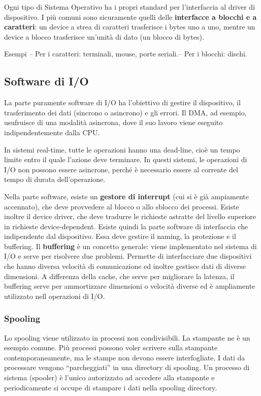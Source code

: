 \documentclass[a4paper]{article}
\begin{document}
Ogni tipo di Sistema Operativo ha i propri standard per l'interfaccia al driver di dispositivo. I più comuni sono sicuramente quelli delle \textbf{interfacce a blocchi e a caratteri}: un device a strea di caratteri trasferisce i bytes uno a uno, mentre un device a blocco trasferisce un'unità di dato (un blocco di bytes).

Esempi \newline -- Per i caratteri: terminali, mouse, porte seriali.\newline -- Per i blocchi: dischi.

\subsection{Software di I/O}
La parte puramente software di I/O ha l'obiettivo di gestire il dispositivo, il trasferimento dei dati (sincrono o asincrono) e gli errori. Il DMA, ad esempio, usufruisce di una modalità asincrona, dove il suo lavoro viene eseguito indipendentemente dalla CPU.

In sistemi real-time, tutte le operazioni hanno una dead-line, cioè un tempo limite entro il quale l'azione deve terminare. In questi sistemi, le operazioni di I/O non possono essere asincrone, perché è necessario essere al corrente del tempo di durata dell'operazione.

Nella parte software, esiste un \textbf{gestore di interrupt} (cui si è già ampiamente accennato), che deve provvedere al blocco o allo sblocco dei processi. Esiste inoltre il device driver, che deve tradurre le richieste astratte del livello superiore in richieste device-dependent. Esiste quindi la parte software di interfaccia che indipendente dal dispositivo. Essa deve gestire il naming, la protezione e il buffering. Il \textbf{buffering} è un concetto generale: viene implementato nel sistema di I/O e serve per risolvere due problemi. Permette di interfacciare due dispositivi che hanno diversa velocità di comunicazione ed inoltre gestisce dati di diverse dimensioni. A differenza della cache, che serve per migliorare la latenza, il buffering serve per ammortizzare dimensioni o velocità diverse ed è ampliamente utilizzato nell operazioni di I/O.

\subsubsection{Spooling}
Lo spooling viene utilizzato in processi non condivisibili. La stampante ne è un esempio comune. Più processi possono voler scrivere sulla stampante contemporaneamente, ma le stampe non devono essere interfogliate. I dati da processare vengono ``parcheggiati'' in una directory di spooling. Un processo di sistema (spooler) è l'unico autorizzato ad accedere alla stampante e periodicamente si occupe di stampare i dati nella spooling directory.
\end{document}
